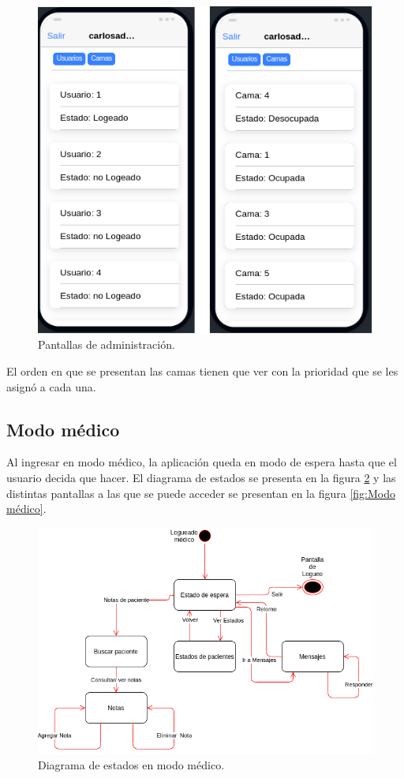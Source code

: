 \begin{figure}[ht]
	\centering
	\includegraphics[scale=.70]{./Figures/app/administracion.png}
	\caption{ Pantallas de administración.}
	\label{fig: Pantallas de administración.}
\end{figure} 

El orden en que se presentan las camas tienen que ver con la prioridad que se les asignó a cada una.



\pagebreak
\subsection{Modo médico}
Al ingresar en modo médico, la aplicación queda en modo de espera hasta que el usuario decida que hacer. El diagrama de estados se presenta en la figura \ref{fig: Diagrama de estados en modo médico.} y las distintas pantallas a las que se puede acceder se presentan en la figura \ref{fig:Modo médico}. 

\begin{figure}[ht]
	\centering
	\includegraphics[scale=.65]{./Figures/app/modo-medico.png}
	\caption{ Diagrama de estados en modo médico.}
	\label{fig: Diagrama de estados en modo médico.}
\end{figure} 

